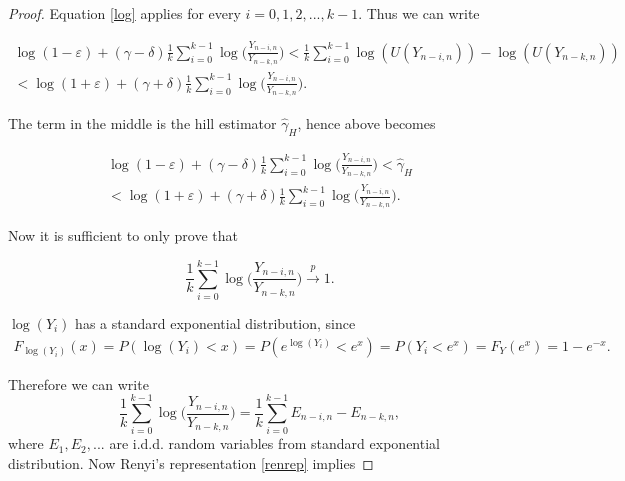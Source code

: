 \documentclass[english,12pt,a4paper,pdftex,sci,utf8]{aaltothesis} %
\begin{document}
\begin{proof}
Equation \ref{log} applies for every $i = 0,1,2,..., k-1$. Thus we can write

\begin{equation*}
\begin{split}
\log(1 - \varepsilon) + (\gamma - \delta) \frac{1}{k} \sum_{i=0}^{k-1} \log\Big(\frac{Y_{n-i,n}}{Y_{n-k,n}}\Big) < \frac{1}{k} \sum_{i=0}^{k-1} \log(U(Y_{n-i,n})) - \log(U(Y_{n-k,n})) \\
< \log(1 + \varepsilon) + (\gamma + \delta) \frac{1}{k} \sum_{i=0}^{k-1} \log\Big(\frac{Y_{n-i,n}}{Y_{n-k,n}}\Big).
\end{split}
\end{equation*}

The term in the middle is the hill estimator $\hat{\gamma}_H$, hence above becomes

\begin{equation*}
\begin{split}
\log(1 - \varepsilon) + (\gamma - \delta) \frac{1}{k} \sum_{i=0}^{k-1} \log\Big(\frac{Y_{n-i,n}}{Y_{n-k,n}}\Big) < \hat{\gamma}_H \\
< \log(1 + \varepsilon) + (\gamma + \delta) \frac{1}{k} \sum_{i=0}^{k-1} \log\Big(\frac{Y_{n-i,n}}{Y_{n-k,n}}\Big).
\end{split}
\end{equation*}

Now it is sufficient to only prove that 

\begin{equation*}
\frac{1}{k} \sum_{i=0}^{k-1} \log\Big(\frac{Y_{n-i,n}}{Y_{n-k,n}}\Big) \xrightarrow{p} 1.
\end{equation*}

$\log(Y_i)$ has a standard exponential distribution, since 
\begin{equation*}
\begin{split}
F_{\log(Y_i)}(x) = P(\log(Y_i) < x) = P(e^{\log(Y_i)} < e^x) = P(Y_i < e^x) = F_Y(e^x) = 1 - {e^{-x}}.
\end{split}
\end{equation*}

Therefore we can write
\begin{equation*}
\frac{1}{k} \sum_{i=0}^{k-1} \log\Big(\frac{Y_{n-i,n}}{Y_{n-k,n}}\Big) = \frac{1}{k} \sum_{i=0}^{k-1} E_{n-i,n} - E_{n-k,n},
\end{equation*}
where $E_1, E_2,...$ are i.d.d. random variables from standard exponential distribution. Now Renyi's representation \ref{renrep} implies


\end{proof}
\end{document}
